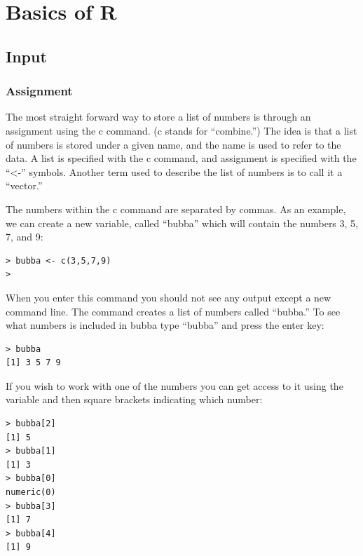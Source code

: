 \section{Basics of R}

\subsection{Input}

\subsubsection{Assignment}

The most straight forward way to store a list of numbers is through an assignment using the c command. (c stands for “combine.”) The idea is that a list of numbers is stored under a given name, and the name is used to refer to the data. A list is specified with the c command, and assignment is specified with the “<-” symbols. Another term used to describe the list of numbers is to call it a “vector.”

The numbers within the c command are separated by commas. As an example, we can create a new variable, called “bubba” which will contain the numbers 3, 5, 7, and 9: \newline

\begin{lstlisting}[frame=single]
> bubba <- c(3,5,7,9)
>
\end{lstlisting}

\clearpage

When you enter this command you should not see any output except a new command line. The command creates a list of numbers called “bubba.” To see what numbers is included in bubba type “bubba” and press the enter key: \newline

\begin{lstlisting}[frame=single]
> bubba
[1] 3 5 7 9
\end{lstlisting}

If you wish to work with one of the numbers you can get access to it using the variable and then square brackets indicating which number: \newline

\begin{lstlisting}[frame=single]
> bubba[2]
[1] 5
> bubba[1]
[1] 3
> bubba[0]
numeric(0)
> bubba[3]
[1] 7
> bubba[4]
[1] 9
\end{lstlisting}

